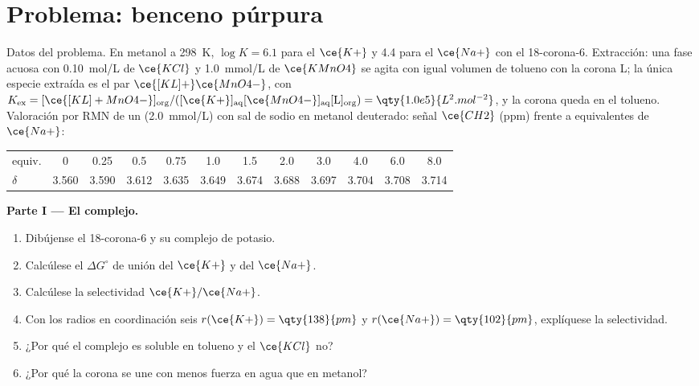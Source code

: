 \section{Problema: benceno púrpura}

\begin{problem}
\label{pb:b3:supramolecular:1}
Datos del problema. En metanol a \qty{298}{K}, $\log K = 6.1$ para el $\ce{K+}$ y 4.4 para el $\ce{Na+}$ con el
18-corona-6. Extracción: una fase acuosa con \qty{0.10}{mol/L} de $\ce{KCl}$ y \qty{1.0}{mmol/L} de $\ce{KMnO4}$ se agita
con igual volumen de tolueno con la corona L; la única especie
extraída es el par $\ce{[KL]+}\ce{MnO4-}$, con
$K_{\mathrm{ex}} = [\ce{[KL]+MnO4-}]_{\mathrm{org}}/([\ce{K+}]_{\mathrm{aq}}[\ce{MnO4-}]_{\mathrm{aq}}[\mathrm L]_{\mathrm{org}}) = \qty{1.0e5}{L^2.mol^{-2}}$, y la corona queda en el tolueno. Valoración por RMN de un
 (\qty{2.0}{mmol/L}) con sal de sodio en metanol deuterado: señal $\ce{CH2}$
(ppm) frente a equivalentes de $\ce{Na+}$:

\begin{center}\small
\begin{tabular}{l*{11}{c}}
\hline
equiv. & 0 & 0.25 & 0.5 & 0.75 & 1.0 & 1.5 & 2.0 & 3.0 & 4.0 & 6.0 & 8.0\\
$\delta$ & 3.560 & 3.590 & 3.612 & 3.635 & 3.649 & 3.674 & 3.688 & 3.697 & 3.704 & 3.708 & 3.714\\
\hline
\end{tabular}
\end{center}

\medskip\noindent\textbf{Parte I --- El complejo.}
\begin{enumerate}
  \item Dibújense el 18-corona-6 y su complejo de potasio.
  \item Calcúlese el $\Delta G^\circ$ de unión del $\ce{K+}$ y del $\ce{Na+}$.
  \item Calcúlese la selectividad $\ce{K+}/\ce{Na+}$.
  \item Con los radios en coordinación seis $r(\ce{K+}) = \qty{138}{pm}$ y $r(\ce{Na+}) = \qty{102}{pm}$, explíquese la selectividad.
  \item ¿Por qué el complejo es soluble en tolueno y el $\ce{KCl}$ no?
  \item ¿Por qué la corona se une con menos fuerza en agua que en metanol?
\end{enumerate}


\end{problem}

